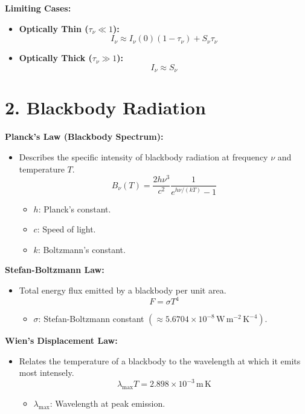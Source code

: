 \documentclass{article}
\begin{document}
\textbf{Limiting Cases:}
\begin{itemize}
    \item \textbf{Optically Thin (\( \tau_\nu \ll 1 \)):}
          \[
              I_\nu \approx I_\nu(0)\left(1 - \tau_\nu\right) + S_\nu \tau_\nu
          \]
    \item \textbf{Optically Thick (\( \tau_\nu \gg 1 \)):}
          \[
              I_\nu \approx S_\nu
          \]
\end{itemize}

\section*{2. Blackbody Radiation}

\textbf{Planck's Law (Blackbody Spectrum):}
\begin{itemize}
    \item Describes the specific intensity of blackbody radiation at frequency \( \nu \) and temperature \( T \).
          \[
              B_\nu(T) = \frac{2h\nu^3}{c^2} \frac{1}{e^{h\nu/(kT)} - 1}
          \]
          \begin{itemize}
              \item \( h \): Planck's constant.
              \item \( c \): Speed of light.
              \item \( k \): Boltzmann's constant.
          \end{itemize}
\end{itemize}

\textbf{Stefan-Boltzmann Law:}
\begin{itemize}
    \item Total energy flux emitted by a blackbody per unit area.
          \[
              F = \sigma T^4
          \]
          \begin{itemize}
              \item \( \sigma \): Stefan-Boltzmann constant \( (\approx 5.6704 \times 10^{-8} \, \mathrm{W\,m^{-2}\,K^{-4}}) \).
          \end{itemize}
\end{itemize}

\textbf{Wien's Displacement Law:}
\begin{itemize}
    \item Relates the temperature of a blackbody to the wavelength at which it emits most intensely.
          \[
              \lambda_{\text{max}} T = 2.898 \times 10^{-3} \, \mathrm{m\,K}
          \]
          \begin{itemize}
              \item \( \lambda_{\text{max}} \): Wavelength at peak emission.
          \end{itemize}
\end{itemize}
\end{document}
